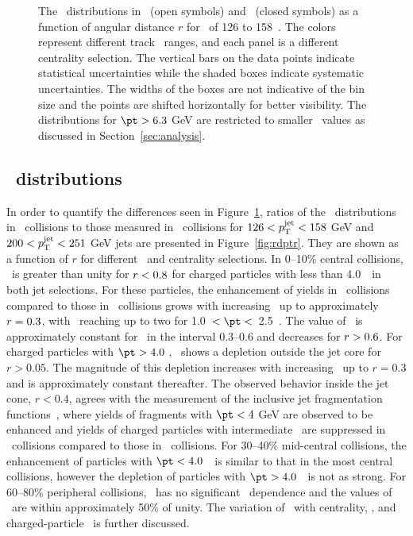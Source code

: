 \begin{figure}[h]
{\begin{tabular}{ccc}
\end{tabular}
}
\caption{The \Dptr\ distributions in \pp\ (open symbols) and \pbpb\ (closed symbols) as a function of angular distance $r$ for \ptjet\ of 126 to 158~\GeV.
The colors represent different track \pt\ ranges, and each panel is a different centrality selection.
The vertical bars on the data points indicate statistical uncertainties while the shaded boxes indicate systematic uncertainties.
The widths of the boxes are not indicative of the bin size and the points are shifted horizontally for better visibility.
The distributions for $\pt > 6.3$ GeV are restricted to smaller \rvar\ values as discussed in Section~\ref{sec:analysis}.}
\label{fig:dptr}
\end{figure}



\subsection{\RDptr\ distributions}
\label{sec:rdptr}
In order to quantify the differences seen in Figure~\ref{fig:dptr}, ratios of the \Dptr\ distributions in \pbpb\ collisions to those measured in \pp\ collisions for $126 < \mbox{$p_{\mathrm{T}}^{\mathrm{jet}}$} < 158$ GeV and $200 < \mbox{$p_{\mathrm{T}}^{\mathrm{jet}}$} < 251$ GeV jets are presented in Figure~\ref{fig:rdptr}.
They are shown as a function of $r$ for different \pt\ and centrality selections.
In 0--10\% central collisions, \RDptr\ is greater than unity for $\mbox{$r$} < 0.8$ for charged particles with \pT less than 4.0~\GeV\ in both jet selections.
For these particles, the enhancement of yields in \pbpb\ collisions compared to those in  \pp\ collisions grows with increasing \rvar\ up to approximately \mbox{$\mbox{$r$}  = 0.3$}, with \RDptr\ reaching up to two for 1.0~$< \pt <$~2.5~\GeV.
The value of \RDptr\ is approximately constant for \rvar\ in the interval \mbox{0.3--0.6} and decreases for \mbox{$\mbox{$r$} > 0.6$}.
For charged particles with $\pt > 4.0$ \GeV, \RDptr\ shows a depletion outside the jet core for $r > 0.05$.
The magnitude of this depletion increases with increasing \rvar\ up to $r = 0.3$ and is approximately constant thereafter.
The observed behavior inside the jet cone, $r < 0.4$, agrees with the measurement of the inclusive jet fragmentation functions~\cite{Aaboud:2017eww,Aaboud:2017bzv, Aaboud:2018hpb}, where yields of fragments with $\pt < 4$ GeV are observed to be enhanced and yields of charged particles with intermediate \pT\ are suppressed in \PbPb\ collisions compared to those in \pp\ collisions.
For 30--40\% mid-central collisions, the enhancement of particles with $\pt < 4.0$~\GeV\ is similar to that in the most central collisions, however the depletion of particles with $\pt > 4.0$~\GeV\ is not as strong.
For 60--80\% peripheral collisions, \RDptr\ has no significant \rvar\ dependence and the values of \RDptr\ are within approximately 50\% of unity.
The variation of \RDptr\ with centrality, \ptjet, and charged-particle \pt\ is further discussed.

